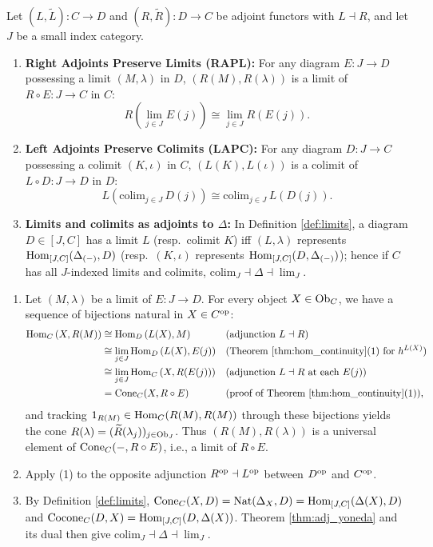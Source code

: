 \documentclass[10pt,a4paper]{article}
\begin{document}
\begin{theorem}\label{thm:rapl_lapc}
Let $(L, \widetilde{L}) : C \to D$ and $(R, \widetilde{R}) : D \to C$ be adjoint functors with $L \dashv R$, and let $J$ be a small index category.
\begin{enumerate}
\item \textbf{Right Adjoints Preserve Limits (RAPL):} For any diagram $E : J \to D$ possessing a limit $(M, \lambda)$ in $D$, $(R(M), R(\lambda))$ is a limit of $R \circ E : J \to C$ in $C$:
$$R\left(\lim_{j \in J} E(j)\right) \cong \lim_{j \in J} R(E(j)).$$
\item \textbf{Left Adjoints Preserve Colimits (LAPC):} For any diagram $D : J \to C$ possessing a colimit $(K, \iota)$ in $C$, $(L(K), L(\iota))$ is a colimit of $L \circ D : J \to D$ in $D$:
$$L\left(\mathrm{colim}_{j \in J}\, D(j)\right) \cong \mathrm{colim}_{j \in J}\, L(D(j)).$$
\item \textbf{Limits and colimits as adjoints to $\Delta$:} In Definition \ref{def:limits}, a diagram $D \in [J, C]$ has a limit $L$ (resp.\ colimit $K$) iff $(L, \lambda)$ represents ${\textrm{Hom}}_{[J,C]}(\Delta_{(-)}, D)$ (resp.\ $(K, \iota)$ represents ${\textrm{Hom}}_{[J,C]}(D, \Delta_{(-)})$); hence if $C$ has all $J$-indexed limits and colimits, $\mathrm{colim}_J \dashv \Delta \dashv \lim_J$.
\end{enumerate}
\end{theorem}
\myprf
\begin{enumerate}
\item Let $(M, \lambda)$ be a limit of $E : J \to D$. For every object $X \in {\textrm{Ob}}_C$, we have a sequence of bijections natural in $X \in C^{\textrm{op}}$:
\begin{align*}
{\textrm{Hom}}_C\left(X, R(M)\right) &\cong {\textrm{Hom}}_D\left(L(X), M\right) && \text{(adjunction $L \dashv R$)} \\
&\cong \lim_{j \in J} {\textrm{Hom}}_D\left(L(X), E(j)\right) && \text{(Theorem \ref{thm:hom_continuity}(1) for $h^{L(X)}$)} \\
&\cong \lim_{j \in J} {\textrm{Hom}}_C\left(X, R(E(j))\right) && \text{(adjunction $L \dashv R$ at each $E(j)$)} \\
&= {\mathrm{Cone}}_C(X, R \circ E) && \text{(proof of Theorem \ref{thm:hom_continuity}(1))},
\end{align*}
and tracking $1_{R(M)} \in {\textrm{Hom}}_C(R(M), R(M))$ through these bijections yields the cone $R(\lambda) = (\widetilde{R}(\lambda_j))_{j \in {\textrm{Ob}}_J}$. Thus $(R(M), R(\lambda))$ is a universal element of ${\mathrm{Cone}}_C(-, R \circ E)$, i.e., a limit of $R \circ E$.
\item Apply (1) to the opposite adjunction $R^{\textrm{op}} \dashv L^{\textrm{op}}$ between $D^{\textrm{op}}$ and $C^{\textrm{op}}$.
\item By Definition \ref{def:limits}, ${\mathrm{Cone}}_C(X, D) = {\textrm{Nat}}(\Delta_X, D) = {\textrm{Hom}}_{[J,C]}(\Delta(X), D)$ and ${\mathrm{Cocone}}_C(D, X) = {\textrm{Hom}}_{[J,C]}(D, \Delta(X))$. Theorem \ref{thm:adj_yoneda} and its dual then give $\mathrm{colim}_J \dashv \Delta \dashv \lim_J$.
\end{enumerate}
\myqed
\end{document}
